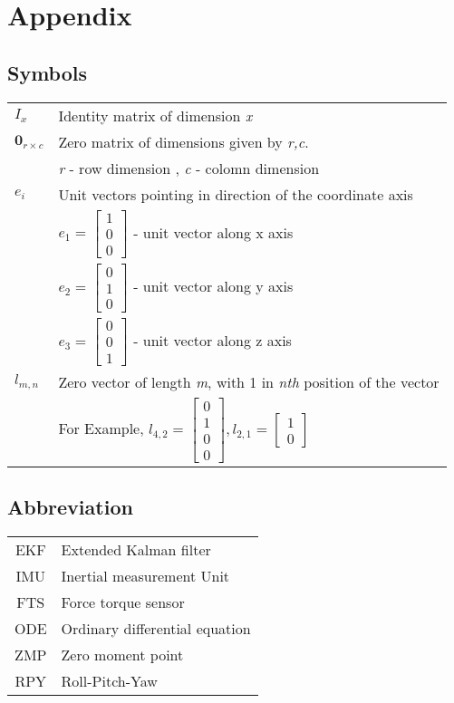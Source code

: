 \chapter{Appendix}
\section{Symbols}
\label{sec:symbols}
\begin{tabular}{p{2cm} l}
$I_{x}$ & Identity matrix of dimension \emph{x} \\
$\textbf{0}_{r \times c}$ & Zero matrix of dimensions given by \emph{r,c}. \\
						  & \emph{r} - row dimension , \emph{c} - colomn dimension \\
$e_i$ 			& Unit vectors pointing in direction of the coordinate axis  \\
				& $e_1 = \begin{bmatrix} 1 \\ 0 \\ 0 \end{bmatrix} $ - unit vector along x axis \\						& $e_2 = \begin{bmatrix} 0 \\ 1 \\ 0 \end{bmatrix} $ - unit vector along y axis \\						& $e_3 = \begin{bmatrix} 0 \\ 0 \\ 1 \end{bmatrix} $ - unit vector along z axis \\	
$l_{m,n}$    	& Zero vector of length \emph{m}, with 1 in \emph{nth} position of the vector \\
			    & For Example, $l_{4,2} = \begin{bmatrix} 0 \\ 1 \\ 0 \\ 0 \end{bmatrix}, l_{2,1} = 						\begin{bmatrix} 1 \\ 0 \end{bmatrix} $ \\		
\end{tabular}

\section{Abbreviation}
\begin{tabular}{c l}
EKF & Extended Kalman filter \\
IMU & Inertial measurement Unit \\
FTS & Force torque sensor \\
ODE & Ordinary differential equation\\
ZMP & Zero moment point\\
RPY & Roll-Pitch-Yaw
\end{tabular}

